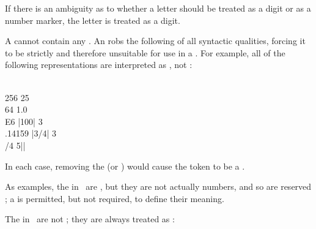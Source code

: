 If there is an ambiguity as to whether
a letter should be treated as a digit or as a number marker,
the letter is treated as a digit.


A  cannot contain any 
.  An   robs the following
 of all syntactic qualities, forcing it to be strictly
 and therefore unsuitable for use in a
.  For example, all of the following
representations are interpreted as , not :

\code
 \\256   25\\64   1.0\\E6   |100|   3\\.14159   |3/4|   3\\/4   5||
\endcode

In each case, removing the   (or ) 
would 
cause the token to be a .

\endsubsubsubsection%


As examples, the  in \thenextfigure\ are ,
but they are not actually numbers, and so are reserved ;
a  is permitted, but not required,
to define their meaning.



The  in \thenextfigure\ are not ; 
they are always treated as :

                                  

